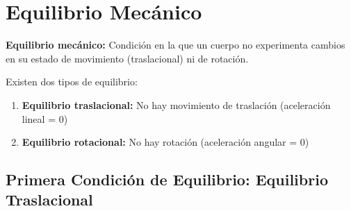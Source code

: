 \begin{center}
\shorthandoff{>}\shorthandoff{<}
\shorthandon{>}\shorthandon{<}
\end{center}

\section*{Equilibrio Mecánico}

\begin{seccion}
\begin{definicion}
    \textbf{Equilibrio mecánico:} Condición en la que un cuerpo no experimenta cambios en su estado de movimiento (traslacional) ni de rotación.
\end{definicion}

Existen dos tipos de equilibrio:
\begin{enumerate}
    \item \textbf{Equilibrio traslacional:} No hay movimiento de traslación (aceleración lineal = 0)
    \item \textbf{Equilibrio rotacional:} No hay rotación (aceleración angular = 0)
\end{enumerate}
\end{seccion}

\subsection{Primera Condición de Equilibrio: Equilibrio Traslacional}

